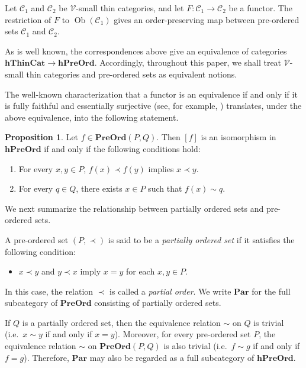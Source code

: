 \documentclass[12pt, a4paper]{amsart}
\theoremstyle{definition}
\newtheorem{proposition}[theorem]{Proposition}
\newcommand{\Ob}{\mathop{\mathrm{Ob}}\nolimits}
\newcommand{\PreOrd}{\mathbf{PreOrd}}
\newcommand{\ParOrd}{\mathbf{Par}}
\newcommand{\hPreOrd}{\mathbf{hPreOrd}}
\newcommand{\hThinCat}{{\mathbf{hThinCat}}}
\begin{document}
Let $\mathcal{C}_1$ and $\mathcal{C}_2$ be $\mathcal{V}$-small thin categories,
and let $F:\mathcal{C}_1\to\mathcal{C}_2$ be a functor.
The restriction of $F$ to $\Ob(\mathcal{C}_1)$ gives an order-preserving map
between pre-ordered sets $\mathcal{C}_1$ and $\mathcal{C}_2$.

As is well known, the correspondences above 
give an equivalence of categories
$\hThinCat\to\hPreOrd$.
Accordingly, throughout this paper, we shall treat
$\mathcal{V}$-small thin categories and pre-ordered sets as equivalent
notions.

The well-known characterization that a functor is an equivalence if and only
if it is fully faithful and essentially surjective
(see, for example, \cite[Theorem 1.5.9]{Riehl2016category})
translates, under the above equivalence, into the following statement.

\begin{proposition}\label{proposition:preord_hisom}
Let $f\in\PreOrd(P,Q)$.
Then $[f]$ is an isomorphism in $\hPreOrd$ if and only if the following
conditions hold:
\begin{enumerate}
    \item For every $x,y\in P$, $f(x)\prec f(y)$ implies $x\prec y$.
    \item For every $q\in Q$, there exists $x\in P$ such that
    $f(x)\sim q$.
\end{enumerate}
\end{proposition}



We next summarize the relationship between partially ordered sets and
pre-ordered sets.

A pre-ordered set $(P,\prec)$ is said to be a \emph{partially ordered set}
if it satisfies the following condition:
\begin{itemize}
    \item $x\prec y$ and $y\prec x$ imply $x=y$ for each $x,y\in P$.
\end{itemize}
In this case, the relation $\prec$ is called a \emph{partial order}.
We write $\ParOrd$ for the full subcategory of $\PreOrd$ consisting of
partially ordered sets.

If $Q$ is a partially ordered set, then the equivalence relation $\sim$ on
$Q$ is trivial (i.e.~$x\sim y$ if and only if $x=y$).
Moreover, for every pre-ordered set $P$, the equivalence relation $\sim$ on
$\PreOrd(P,Q)$ is also trivial (i.e.~$f\sim g$ if and only if $f=g$).
Therefore, $\ParOrd$ may also be regarded as a full subcategory of
$\hPreOrd$.
\end{document}
